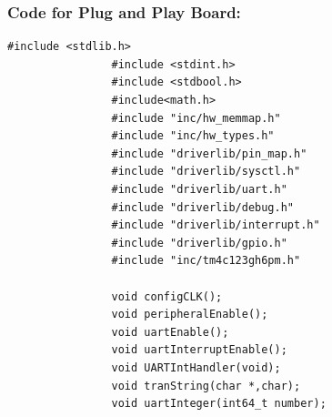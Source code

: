 \documentclass[a4paper,10pt,oneside]{article}
\begin{document}
			\subsubsection{\textbf{Code for Plug and Play Board:}}
				\begin{lstlisting}[style=CStyle]
				#include <stdlib.h>
				#include <stdint.h>
				#include <stdbool.h>
				#include<math.h>
				#include "inc/hw_memmap.h"
				#include "inc/hw_types.h"
				#include "driverlib/pin_map.h"
				#include "driverlib/sysctl.h"
				#include "driverlib/uart.h"
				#include "driverlib/debug.h"
				#include "driverlib/interrupt.h"
				#include "driverlib/gpio.h"
				#include "inc/tm4c123gh6pm.h"
			
				void configCLK();
				void peripheralEnable();
				void uartEnable();
				void uartInterruptEnable();
				void UARTIntHandler(void);
				void tranString(char *,char);
				void uartInteger(int64_t number);
			

\end{lstlisting}
\end{document}
